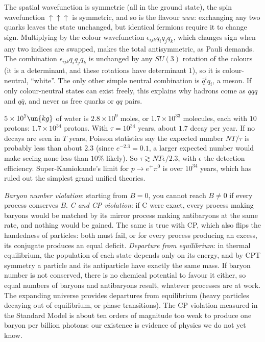  The spatial wavefunction is symmetric (all in the ground state), the spin wavefunction $\uparrow\uparrow\uparrow$ is symmetric, and so is the flavour $uuu$: exchanging any two quarks leaves the state unchanged, but identical fermions require it to change sign. Multiplying by the colour wavefunction $\epsilon_{ijk}q_iq_jq_k$, which changes sign when any two indices are swapped, makes the total antisymmetric, as Pauli demands. The combination $\epsilon_{ijk}q_iq_jq_k$ is unchanged by any $SU(3)$ rotation of the colours (it is a determinant, and these rotations have determinant $1$), so it is colour-neutral, ``white''. The only other simple neutral combination is $\bar q^iq_i$, a meson. If only colour-neutral states can exist freely, this explains why hadrons come as $qqq$ and $q\bar q$, and never as free quarks or $qq$ pairs.

 $5\times10^7\un{kg}$ of water is $2.8\times10^9$ moles, or $1.7\times10^{33}$ molecules, each with $10$ protons: $1.7\times10^{34}$ protons. With $\tau = 10^{34}$ years, about $1.7$ decay per year. If no decays are seen in $T$ years, Poisson statistics say the expected number $NT/\tau$ is probably less than about $2.3$ (since $e^{-2.3} = 0.1$, a larger expected number would make seeing none less than $10\%$ likely). So $\tau\gtrsim NT\epsilon/2.3$, with $\epsilon$ the detection efficiency. Super-Kamiokande's limit for $p\to e^+\pi^0$ is over $10^{34}$ years, which has ruled out the simplest grand unified theories.

 \emph{Baryon number violation}: starting from $B = 0$, you cannot reach $B\neq0$ if every process conserves $B$. \emph{C and CP violation}: if C were exact, every process making baryons would be matched by its mirror process making antibaryons at the same rate, and nothing would be gained. The same is true with CP, which also flips the handedness of particles: both must fail, or for every process producing an excess, its conjugate produces an equal deficit. \emph{Departure from equilibrium}: in thermal equilibrium, the population of each state depends only on its energy, and by CPT symmetry a particle and its antiparticle have exactly the same mass. If baryon number is not conserved, there is no chemical potential to favour it either, so equal numbers of baryons and antibaryons result, whatever processes are at work. The expanding universe provides departures from equilibrium (heavy particles decaying out of equilibrium, or phase transitions). The CP violation measured in the Standard Model is about ten orders of magnitude too weak to produce one baryon per billion photons: our existence is evidence of physics we do not yet know.

